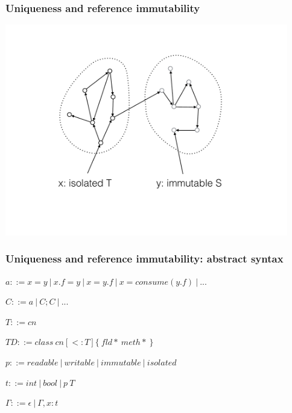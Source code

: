 \begin{frame}
    \frametitle{Uniqueness and reference immutability}
    \includegraphics[width=350pt]{iso_imm.pdf}
\end{frame}

\begin{frame}
    \frametitle{Uniqueness and reference immutability: abstract syntax}

    $a ::= x = y\ |\ x.f = y\ |\ x = y.f\ |\ x = consume(y.f)\ |\ ...$

    $C ::= a\ |\ C; C\ |\ ...$

    $T ::= cn$

    $TD ::= class\ cn [<: T] \{\ fld*\ meth*\ \}$

    $p ::= readable\ |\ writable\ |\ immutable\ |\ isolated$

    $t ::= int\ |\ bool\ |\ p\ T$

    $\Gamma ::= \epsilon\ |\ \Gamma, x: t$
\end{frame}

